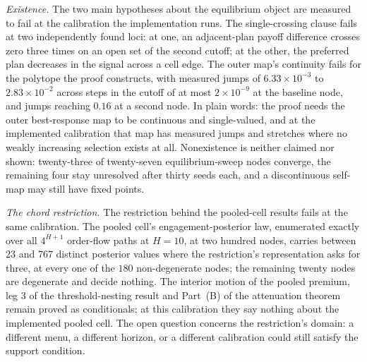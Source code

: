 \documentclass[11pt]{article}
\begin{document}
\emph{Existence.} The two main hypotheses about the equilibrium object are measured to fail at the
calibration the implementation runs. The single-crossing clause fails at two independently found
loci: at one, an adjacent-plan payoff difference crosses zero three times on an open set of the
second cutoff; at the other, the preferred plan decreases in the signal across a cell edge. The
outer map's continuity fails for the polytope the proof constructs, with measured jumps of
$6.33\times10^{-3}$ to $2.83\times10^{-2}$ across steps in the cutoff of at most
$2\times10^{-9}$ at the baseline node, and jumps reaching $0.16$ at a second node. In plain words: the proof needs the outer best-response map to be continuous and
single-valued, and at the implemented calibration that map has measured jumps and stretches where
no weakly increasing selection exists at all. Nonexistence is neither claimed nor shown:
twenty-three of twenty-seven equilibrium-sweep nodes converge, the remaining four stay unresolved
after thirty seeds each, and a discontinuous self-map may still have fixed points.

\emph{The chord restriction.} The restriction behind the pooled-cell results fails at the same
calibration. The pooled cell's engagement-posterior law, enumerated exactly over all $4^{H+1}$
order-flow paths at $H = 10$, at two hundred nodes, carries between $23$ and $767$ distinct posterior values
where the restriction's representation asks for three, at every one of the $180$ non-degenerate
nodes; the remaining twenty nodes are degenerate and decide nothing. The interior motion of the
pooled premium, leg 3 of the threshold-nesting result and Part~(B) of the attenuation theorem
remain proved as conditionals; at this calibration they say nothing about the implemented pooled
cell. The open question concerns the restriction's domain: a different menu, a different horizon,
or a different calibration could still satisfy the support condition.
\end{document}
